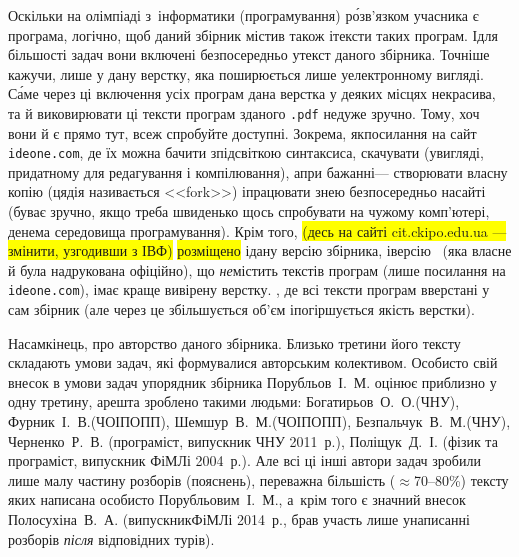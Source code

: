 \documentclass[14pt,a4paper]{extarticle}
\begin{document}
Оскільки на олімпіаді з~інформатики (програмування) р\'{о}зв'язком учасника є програма, логічно, щоб даний збірник містив також і\nolinebreak[3] тексти таких програм. І\nolinebreak[3] для більшості задач вони %
\ifallIdeOneLinksCopiedHere
включені безпосередньо у\nolinebreak[3] текст даного збірника. Точніше кажучи, лише у дану верстку, яка поширюється лише у\nolinebreak[3] електронному вигляді. С\'{а}ме через ці включення усіх програм дана верстка у деяких місцях некрасива, та й виковирювати ці тексти програм з\nolinebreak[3] даного \texttt{.pdf} не\nolinebreak[3] дуже зручно. Тому, хоч вони й є прямо тут, все\nolinebreak[3] ж спробуйте
\else
доступні. Зокрема, як\nolinebreak[3] посилання на\nolinebreak[3] 
\fi
сайт \verb"ideone.com", де їх можна бачити з\nolinebreak[3] підсвіткою синтаксиса, скачувати (у\nolinebreak[3] вигляді, придатному для редагування і компілювання), а\nolinebreak[3] при бажанні\nolinebreak[3] --- створювати власну копію (ця\nolinebreak[3] дія називається <<fork>>) і\nolinebreak[3] працювати з\nolinebreak[3] нею безпосередньо на\nolinebreak[3] сайті (буває зручно, якщо треба швиденько щось спробувати на чужому комп'ютері, де\nolinebreak[3] нема середовища програмування). 
Крім того, 
\colorbox{yellow}{(десь на сайті cit.ckipo.edu.ua --- змінити, узгодивши з ІВФ)} %
\colorbox{yellow}{розміщено} і\nolinebreak[3] дану версію збірника, і\nolinebreak[3] версію%
\ifallIdeOneLinksCopiedHere%
\ (яка власне й була надрукована офіційно), що \emph{не}\nolinebreak[3] містить текстів програм (лише посилання на \verb"ideone.com"), і\nolinebreak[3] має краще вивірену верстку.
\else%
, де всі тексти програм вверстані у сам збірник (але через це збільшується об'єм і\nolinebreak[3] погіршується якість верстки).
\fi

Насамкінець, про авторство даного збірника. Близько третини його тексту складають умови задач, які формувалися авторським колективом. Особисто свій внесок в умови задач упорядник збірника Порубльов~І.~М. оцінює приблизно у одну третину, а\nolinebreak[3] решта зроблено такими людьми: Богатирьов~О.~О.\nolinebreak[3] (ЧНУ), Фурник~І.~В.\nolinebreak[3] (ЧОІПОПП), Шемшур~В.~М.\nolinebreak[3] (ЧОІПОПП), Безпальчук~В.~М.\nolinebreak[3] (ЧНУ), Черненко~Р.~В. (програміст, випускник ЧНУ 2011~р.), Поліщук~Д.~І. (фізик та програміст, випускник \mbox{ФіМЛі} 2004~р.). 
Але всі ці інші автори задач зробили лише малу частину розборів (пояснень), переважна більшість ($\approx$70--80\%) тексту яких написана особисто Порубльовим~І.~М., а~крім того є значний внесок Полосухіна~В.~А. (випускник\nolinebreak[2] \mbox{ФіМЛі} 2014~р., брав участь лише у\nolinebreak[3] написанні розборів \emph{після} відповідних турів).
\end{document}
